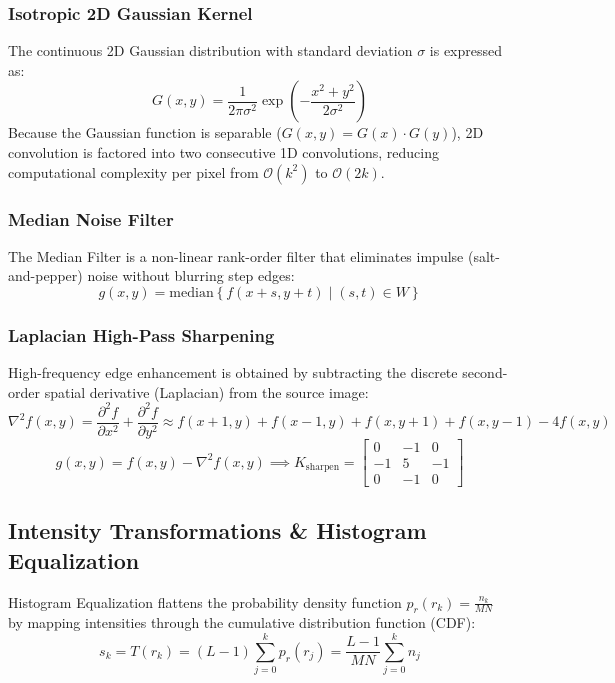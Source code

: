 \documentclass[12pt,a4paper]{article}
\begin{document}
\subsubsection{Isotropic 2D Gaussian Kernel}
The continuous 2D Gaussian distribution with standard deviation $\sigma$ is expressed as:
\begin{equation}
G(x, y) = \frac{1}{2\pi\sigma^2} \exp\left(-\frac{x^2 + y^2}{2\sigma^2}\right)
\end{equation}
Because the Gaussian function is separable ($G(x, y) = G(x) \cdot G(y)$), 2D convolution is factored into two consecutive 1D convolutions, reducing computational complexity per pixel from $\mathcal{O}(k^2)$ to $\mathcal{O}(2k)$.

\subsubsection{Median Noise Filter}
The Median Filter is a non-linear rank-order filter that eliminates impulse (salt-and-pepper) noise without blurring step edges:
\begin{equation}
g(x, y) = \text{median} \left\{ f(x+s, y+t) \mid (s, t) \in W \right\}
\end{equation}

\subsubsection{Laplacian High-Pass Sharpening}
High-frequency edge enhancement is obtained by subtracting the discrete second-order spatial derivative (Laplacian) from the source image:
\begin{equation}
\nabla^2 f(x, y) = \frac{\partial^2 f}{\partial x^2} + \frac{\partial^2 f}{\partial y^2} \approx f(x+1, y) + f(x-1, y) + f(x, y+1) + f(x, y-1) - 4f(x, y)
\end{equation}
\begin{equation}
g(x, y) = f(x, y) - \nabla^2 f(x, y) \implies K_{\text{sharpen}} = \begin{bmatrix} 0 & -1 & 0 \\ -1 & 5 & -1 \\ 0 & -1 & 0 \end{bmatrix}
\end{equation}

\subsection{Intensity Transformations \& Histogram Equalization}
Histogram Equalization flattens the probability density function $p_r(r_k) = \frac{n_k}{MN}$ by mapping intensities through the cumulative distribution function (CDF):
\begin{equation}
s_k = T(r_k) = (L-1) \sum_{j=0}^{k} p_r(r_j) = \frac{L-1}{MN} \sum_{j=0}^{k} n_j
\end{equation}
\end{document}
